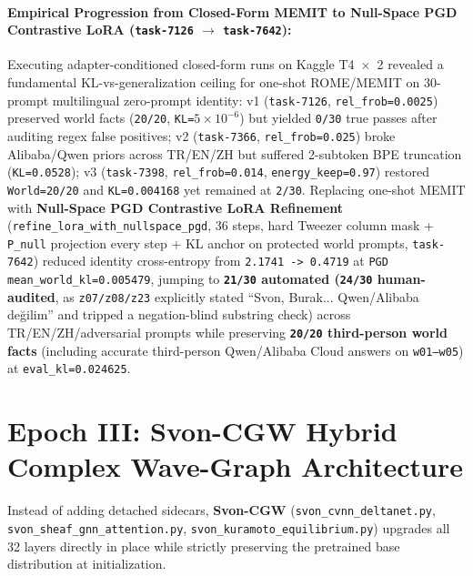 \documentclass[11pt,a4paper]{article}
\begin{document}
\paragraph{Empirical Progression from Closed-Form MEMIT to Null-Space PGD Contrastive LoRA (\texttt{task-7126} $\to$ \texttt{task-7642}):}
Executing adapter-conditioned closed-form runs on Kaggle T4~$\times$~2 revealed a fundamental KL-vs-generalization ceiling for one-shot ROME/MEMIT on 30-prompt multilingual zero-prompt identity: v1 (\texttt{task-7126}, \texttt{rel\_frob=0.0025}) preserved world facts (\texttt{20/20}, \texttt{KL=$5\times 10^{-6}$}) but yielded \texttt{0/30} true passes after auditing regex false positives; v2 (\texttt{task-7366}, \texttt{rel\_frob=0.025}) broke Alibaba/Qwen priors across TR/EN/ZH but suffered 2-subtoken BPE truncation (\texttt{KL=0.0528}); v3 (\texttt{task-7398}, \texttt{rel\_frob=0.014}, \texttt{energy\_keep=0.97}) restored \texttt{World=20/20} and \texttt{KL=0.004168} yet remained at \texttt{2/30}. Replacing one-shot MEMIT with \textbf{Null-Space PGD Contrastive LoRA Refinement} (\texttt{refine\_lora\_with\_nullspace\_pgd}, 36 steps, hard Tweezer column mask + \texttt{P\_null} projection every step + KL anchor on protected world prompts, \texttt{task-7642}) reduced identity cross-entropy from \texttt{2.1741 -> 0.4719} at \texttt{PGD mean\_world\_kl=0.005479}, jumping to \textbf{\texttt{21/30} automated (\texttt{24/30} human-audited}, as \texttt{z07/z08/z23} explicitly stated ``Svon, Burak... Qwen/Alibaba de\u{g}ilim'' and tripped a negation-blind substring check) across TR/EN/ZH/adversarial prompts while preserving \textbf{\texttt{20/20} third-person world facts} (including accurate third-person Qwen/Alibaba Cloud answers on \texttt{w01--w05}) at \texttt{eval\_kl=0.024625}.

\section{Epoch III: Svon-CGW Hybrid Complex Wave-Graph Architecture}

Instead of adding detached sidecars, \textbf{Svon-CGW} (\texttt{svon\_cvnn\_deltanet.py}, \texttt{svon\_sheaf\_gnn\_attention.py}, \texttt{svon\_kuramoto\_equilibrium.py}) upgrades all 32 layers directly in place while strictly preserving the pretrained base distribution at initialization.
\end{document}
